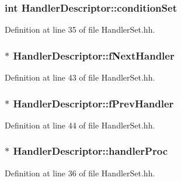 \subsubsection[{condition\+Set}]{\setlength{\rightskip}{0pt plus 5cm}int Handler\+Descriptor\+::condition\+Set}\label{classHandlerDescriptor_aa5949927e37ac20a0b4c86f485571c39}


Definition at line 35 of file Handler\+Set.\+hh.

\subsubsection[{f\+Next\+Handler}]{$\ast$ Handler\+Descriptor\+::f\+Next\+Handler\hspace{0.3cm}{\ttfamily [private]}}\label{classHandlerDescriptor_afaae769589af45271852ef9c39ff7626}


Definition at line 43 of file Handler\+Set.\+hh.

\subsubsection[{f\+Prev\+Handler}]{$\ast$ Handler\+Descriptor\+::f\+Prev\+Handler\hspace{0.3cm}{\ttfamily [private]}}\label{classHandlerDescriptor_a99cd27a61c7cd3f99409d71cc980bc69}


Definition at line 44 of file Handler\+Set.\+hh.

\subsubsection[{handler\+Proc}]{$\ast$ Handler\+Descriptor\+::handler\+Proc}\label{classHandlerDescriptor_a08065826974543acb51ec396b88f6cd1}


Definition at line 36 of file Handler\+Set.\+hh.

